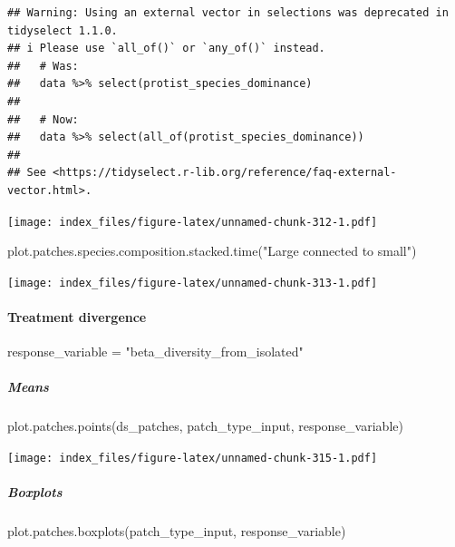\documentclass[
]{article}
\newenvironment{Shaded}{\begin{snugshade}}{\end{snugshade}}
\newcommand{\FunctionTok}[1]{\textcolor[rgb]{0.00,0.00,0.00}{#1}}
\newcommand{\NormalTok}[1]{#1}
\newcommand{\OtherTok}[1]{\textcolor[rgb]{0.56,0.35,0.01}{#1}}
\newcommand{\StringTok}[1]{\textcolor[rgb]{0.31,0.60,0.02}{#1}}
\begin{document}
\begin{verbatim}
## Warning: Using an external vector in selections was deprecated in tidyselect 1.1.0.
## i Please use `all_of()` or `any_of()` instead.
##   # Was:
##   data %>% select(protist_species_dominance)
## 
##   # Now:
##   data %>% select(all_of(protist_species_dominance))
## 
## See <https://tidyselect.r-lib.org/reference/faq-external-vector.html>.
\end{verbatim}

\texttt{[image: index\_files/figure-latex/unnamed-chunk-312-1.pdf]}

\begin{Shaded}
\begin{Highlighting}[]
\FunctionTok{plot.patches.species.composition.stacked.time}\NormalTok{(}\StringTok{"Large connected to small"}\NormalTok{)}
\end{Highlighting}
\end{Shaded}

\texttt{[image: index\_files/figure-latex/unnamed-chunk-313-1.pdf]}

\hypertarget{treatment-divergence}{%
\paragraph{Treatment divergence}\label{treatment-divergence}}

\begin{Shaded}
\begin{Highlighting}[]
\NormalTok{response\_variable }\OtherTok{=} \StringTok{"beta\_diversity\_from\_isolated"}
\end{Highlighting}
\end{Shaded}

\hypertarget{means-22}{%
\subparagraph{Means}\label{means-22}}

\begin{Shaded}
\begin{Highlighting}[]
\FunctionTok{plot.patches.points}\NormalTok{(ds\_patches, patch\_type\_input,}
\NormalTok{                    response\_variable)}
\end{Highlighting}
\end{Shaded}

\texttt{[image: index\_files/figure-latex/unnamed-chunk-315-1.pdf]}

\hypertarget{boxplots-21}{%
\subparagraph{Boxplots}\label{boxplots-21}}

\begin{Shaded}
\begin{Highlighting}[]
\FunctionTok{plot.patches.boxplots}\NormalTok{(patch\_type\_input,}
\NormalTok{                      response\_variable)}
\end{Highlighting}
\end{Shaded}
\end{document}
